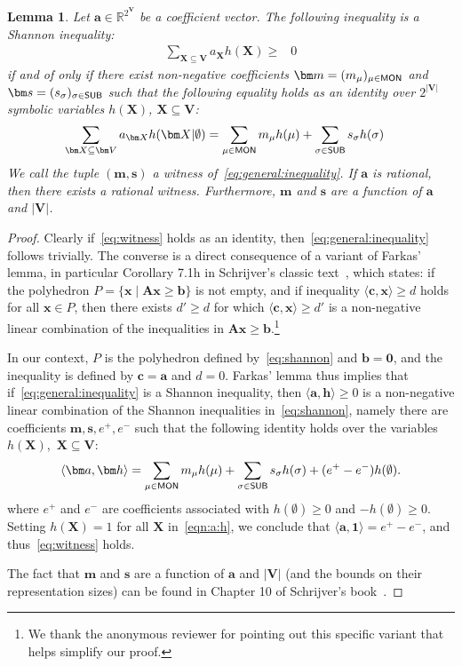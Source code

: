 \documentclass[10pt,a4paper]{article}
\newtheorem{lemma}{Lemma}[section]
\newcommand{\inner}[1]{\langle #1 \rangle}
\newcommand{\R}{\mathbb R} %
\newcommand{\mon}{\text{\sf MON}}
\newcommand{\sub}{\text{\sf SUB}}
\begin{document}
\begin{lemma}
Let $\bm a \in \R^{2^{\bm V}}$ be a coefficient vector. The following inequality is a
Shannon inequality:
%
\begin{align}
  \sum_{\bm X \subseteq \bm V} a_{\bm X}h(\bm X) \geq & 0 \label{eq:general:inequality}
\end{align}
if and of only if there exist non-negative coefficients
$\bm m = (m_\mu)_{\mu \in \mon}$ and $\bm s = (s_\sigma)_{\sigma \in \sub}$
such that the following equality holds as an identity over $2^{|\bm V|}$ symbolic variables
$h(\bm X)$, $\bm X \subseteq \bm V$:
%
\begin{align}
\sum_{\bm X \subseteq \bm V} a_{\bm X}h(\bm X|\emptyset)
  &= \sum_{\mu \in \mon} m_\mu h(\mu) + \sum_{\sigma \in \sub} s_\sigma  h(\sigma)
  \label{eq:witness}
\end{align}
We call the tuple $(\bm m, \bm s)$
a {\em witness} of~\eqref{eq:general:inequality}.
If $\bm a$ is rational, then there exists a rational witness.
Furthermore, $\bm m$ and $\bm s$ are a function of $\bm a$ and $|\bm V|$.
\label{lmm:witness}
\end{lemma}
\begin{proof}
Clearly if~\eqref{eq:witness} holds as an identity, then~\eqref{eq:general:inequality}
follows trivially.
The converse is a direct consequence of a variant of Farkas' lemma, in particular
Corollary 7.1h in Schrijver's classic text~\cite{schrijver-book}, which states:
if the polyhedron $P = \{ \bm x \; | \; \bm A\bm x \geq \bm b\}$ is not empty,
and if inequality $\inner{\bm c, \bm x} \geq d$ holds for all $\bm x \in P$,
then there exists $d'\geq d$ for which $\inner{\bm c, \bm x} \geq d'$
is a non-negative linear combination of the inequalities in $\bm A\bm x
\geq \bm b$.\footnote{We thank the anonymous reviewer for pointing out this
specific variant that helps simplify our proof.}

In our context, $P$ is the polyhedron defined by~\eqref{eq:shannon}
and $\bm b = \bm 0$, and the inequality is defined by  $\bm c = \bm a$ and
$d=0$.
Farkas' lemma thus implies that if~\eqref{eq:general:inequality}
is a Shannon inequality, then $\inner{\bm a, \bm h} \geq 0$ is a non-negative linear combination
of the Shannon inequalities in~\eqref{eq:shannon}, namely there
are coefficients $\bm m,\bm s,e^+,e^-$ such that
the following identity holds
over the variables $h(\bm X)$,~$\bm X \subseteq \bm V$:
\begin{align}
\inner{\bm a, \bm h} = \sum_{\mu \in \mon} m_\mu h(\mu) + \sum_{\sigma \in \sub} s_\sigma h(\sigma)
+(e^+ - e^-)h(\emptyset).
\label{eqn:a:h}
\end{align}
where $e^+$ and $e^-$ are coefficients associated with $h(\emptyset) \geq 0$
and $-h(\emptyset) \geq 0$.
Setting $h(\bm X)=1$ for all $\bm X$ in~\eqref{eqn:a:h}, we conclude that $\inner{\bm a,\bm 1}=e^+ - e^-$,
and thus~\eqref{eq:witness} holds.

The fact that $\bm m$ and $\bm s$ are a function of $\bm a$ and $|\bm V|$ (and the bounds
on their representation sizes) can be found in Chapter 10 of Schrijver's book~\cite{schrijver-book}.
\end{proof}
\end{document}
